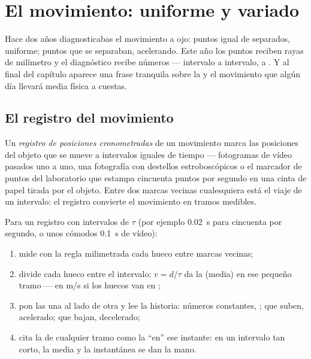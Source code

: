\chapter{El movimiento: uniforme y variado}\label{ch:g9:uniform-varied-motion}

Hace dos años diagnosticabas el movimiento a ojo: puntos igual de
separados, uniforme; puntos que se separaban, acelerando. Este año los
puntos reciben rayas de milímetro y el diagnóstico recibe números ---
intervalo a intervalo,  a . Y al final
del capítulo aparece una frase tranquila sobre la
 y el movimiento que algún día llevará media física a
cuestas.

\section{El registro del movimiento}

\begin{definition}\label{def:g9:uniform-varied-motion:record}
Un \emph{registro de posiciones cronometradas} de un movimiento marca las posiciones del
objeto que se mueve a intervalos iguales de tiempo --- fotogramas de
vídeo pasados uno a uno, una fotografía con destellos estroboscópicos o
el marcador de puntos del laboratorio que estampa cincuenta puntos por
segundo en una cinta de papel tirada por el objeto. Entre dos marcas
vecinas cualesquiera está el viaje de un intervalo: el registro
convierte el movimiento en tramos medibles.
\end{definition}

\begin{method}\label{met:g9:uniform-varied-motion:read}
Para un registro con intervalos de  $\tau$ (por ejemplo
\qty{0.02}{s} para cincuenta por segundo, o unos cómodos \qty{0.1}{s}
de vídeo):
\begin{enumerate}
  \item mide con la regla milimetrada cada hueco entre marcas
        vecinas;
  \item divide cada hueco entre el intervalo: $v = d/\tau$ da la
         (media) en ese pequeño tramo --- en \unit{m/s}
        si los huecos van en ;
  \item pon las  una al lado de otra y lee la
        historia: números constantes, ; que
        suben, acelerado; que bajan, decelerado;
  \item cita la  de cualquier tramo como la
         ``en'' ese instante: en un intervalo tan
        corto, la media y la instantánea se dan la mano.
\end{enumerate}
\end{method}

